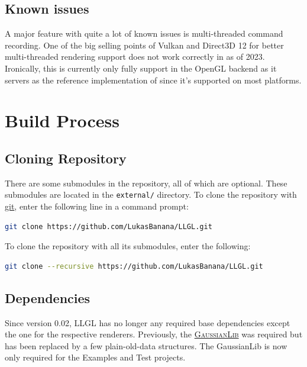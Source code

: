 \documentclass{article}
\begin{document}
\subsection{Known issues}
A major feature with quite a lot of known issues is multi-threaded command recording.
One of the big selling points of Vulkan and Direct3D 12 for better multi-threaded rendering support does not work correctly in \LLGL as of 2023.
Ironically, this is currently only fully support in the OpenGL backend as it servers as the reference implementation of \LLGL since it's supported on most platforms.



\newpage
\section{Build Process}

\subsection{Cloning Repository}

There are some submodules in the \LLGL repository, all of which are optional.
These submodules are located in the \texttt{external/} directory.
To clone the repository with \href{https://git-scm.com/}{git}, enter the following line in a command prompt:
\begin{lstlisting}[language=sh]
git clone https://github.com/LukasBanana/LLGL.git
\end{lstlisting}
To clone the repository with all its submodules, enter the following:
\begin{lstlisting}[language=sh]
git clone --recursive https://github.com/LukasBanana/LLGL.git
\end{lstlisting}

\subsection{Dependencies}

Since version 0.02, LLGL has no longer any required base dependencies except the one for the respective renderers.
Previously, the \href{https://github.com/LukasBanana/GaussianLib}{\textsc{GaussianLib}} was required but has been replaced by a few plain-old-data structures.
The GaussianLib is now only required for the Examples and Test projects.
\end{document}
